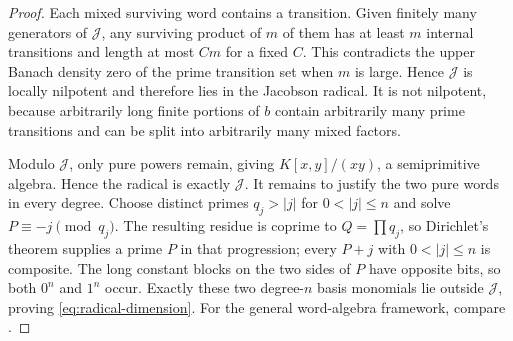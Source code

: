 \documentclass[11pt]{article}
\theoremstyle{definition}
\theoremstyle{remark}
\begin{document}
\begin{proof}
Each mixed surviving word contains a transition.  Given finitely many generators of
$\mathcal J$, any surviving product of $m$ of them has at least $m$ internal
transitions and length at most $Cm$ for a fixed $C$.  This contradicts the upper Banach
density zero of the prime transition set when $m$ is large.  Hence $\mathcal J$ is
locally nilpotent and therefore lies in the Jacobson radical.  It is not nilpotent,
because arbitrarily long finite portions of $b$ contain arbitrarily many prime
transitions and can be split into arbitrarily many mixed factors.

Modulo $\mathcal J$, only pure powers remain, giving $K[x,y]/(xy)$, a semiprimitive
algebra.  Hence the radical is exactly $\mathcal J$.  It remains to justify the two pure
words in every degree.  Choose distinct primes $q_j>|j|$ for
$0<|j|\le n$ and solve $P\equiv-j\pmod{q_j}$.  The resulting residue is coprime to
$Q=\prod q_j$, so Dirichlet's theorem supplies a prime $P$ in that progression; every
$P+j$ with $0<|j|\le n$ is composite.  The long constant blocks on the two sides of
$P$ have opposite bits, so both $0^n$ and $1^n$ occur.  Exactly these two degree-$n$
basis monomials lie outside $\mathcal J$, proving \eqref{eq:radical-dimension}.
For the general word-algebra framework, compare \cite{BellWordAlgebra}.
\end{proof}
\end{document}
